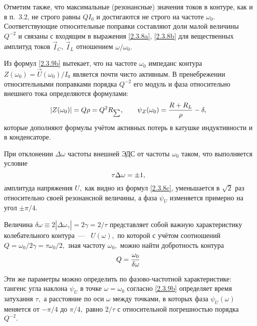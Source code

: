 Отметим также, что максимальные (резонансные) значения токов в контуре, как и в п.~3.2, не строго равны $QI_0$ и достигаются не строго на частоте $\omega_0.$ Соответствующие относительные поправки составляют доли малой величины $Q^{-2}$ и связаны с входящим в выражения \eqref{2.3.8a}, \eqref{2.3.8b} для вещественных амплитуд токов $\vec I_C$, $\vec I_L$ отношением $\omega/\omega_0.$

Из формул \eqref{2.3.9b} вытекает, что на частоте $\omega_0$ импеданс контура $Z(\omega_0)=\vec U(\omega_0)/I_0$ является почти чисто активным. В пренебрежении относительными поправками порядка $Q^{-2}$ его модуль и фаза относительно внешнего тока определяются формулами:
\begin{equation}\eqmark{2.3.10}
|Z(\omega_0)|=Q\rho=Q^2R_{\scriptscriptstyle \sum}, \qquad \psi_Z(\omega_0)=\dfrac{R+R_L}{\rho}-\delta,
\end{equation}
которые дополняют формулы  учётом активных потерь в катушке индуктивности и в конденсаторе.

При отклонении $\Delta\omega$ частоты внешней ЭДС от частоты $\omega_0$ таком, что выполняется условие
\begin{equation}\eqmark{2.3.11}
\tau\Delta\omega=\pm1,
\end{equation}
амплитуда напряжения $U,$ как видно из формул \eqref{2.3.8c}, уменьшается в $\sqrt{2}$ раз относительно своей резонансной величины, а фаза $\psi_U$ изменяется примерно на угол $\pm\pi/4.$

Величина $\delta\omega\equiv2|\Delta\omega_{\gamma}|=2\gamma=2/\tau$ представляет собой важную характеристику колебательного контура~---~ $U(\omega),$ по которой с учётом соотношений $Q=\omega_0/2\gamma=\tau\omega_0/2,$ зная частоту $\omega_0,$ можно найти добротность контура
\begin{equation}\eqmark{2.3.12}
Q=\dfrac{\omega_0}{\delta\omega}
\end{equation}

Эти же параметры можно определить по фазово-частотной характеристике: тангенс угла наклона $\psi_U$ в точке $\omega=\omega_0$ согласно \eqref{2.3.9b} определяет время затухания $\tau,$ а расстояние по оси $\omega$ между точками, в которых фаза $\psi_U(\omega)$ меняется от $-\pi/4$ до $\pi/4,$ равно $2/\tau$ с относительной погрешностью порядка $Q^{-2}.$

